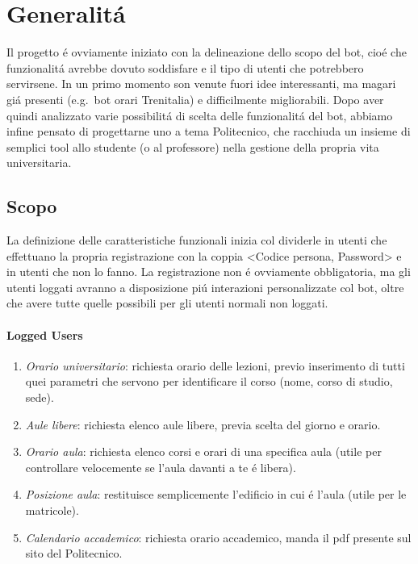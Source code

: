 \documentclass[]{article}
\begin{document}
\section{Generalitá}
Il progetto é ovviamente iniziato con la delineazione dello scopo del bot, cioé che funzionalitá avrebbe dovuto soddisfare e il tipo di utenti che potrebbero servirsene. In un primo momento son venute fuori idee interessanti, ma magari giá presenti (e.g.\ bot orari Trenitalia) e difficilmente migliorabili.
Dopo aver quindi analizzato varie possibilitá di scelta delle funzionalitá del bot, abbiamo infine pensato di progettarne uno a tema Politecnico, che racchiuda un insieme di semplici tool allo studente (o al professore) nella gestione della propria vita universitaria. 

\subsection{Scopo}
La definizione delle caratteristiche funzionali inizia col dividerle in utenti che effettuano la propria registrazione con la coppia <Codice persona, Password> e in utenti che non lo fanno. La registrazione non é ovviamente obbligatoria, ma gli utenti loggati avranno a disposizione piú interazioni personalizzate col bot, oltre che avere tutte quelle possibili per gli utenti normali non loggati.

\paragraph{Logged Users}
\begin{enumerate}
\item \textit{Orario universitario}: richiesta orario delle lezioni, previo inserimento di tutti quei parametri che servono per identificare il corso (nome, corso di studio, sede).
\item \textit{Aule libere}: richiesta elenco aule libere, previa scelta del giorno e orario.
\item \textit{Orario aula}: richiesta elenco corsi e orari di una specifica aula (utile per controllare velocemente se l'aula davanti a te é libera).
\item \textit{Posizione aula}: restituisce semplicemente l'edificio in cui é l'aula (utile per le matricole).
\item \textit{Calendario accademico}: richiesta orario accademico, manda il pdf presente sul sito del Politecnico.
\end{enumerate}
\end{document}
